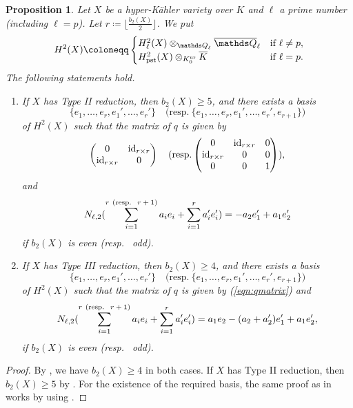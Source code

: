 \documentclass[12pt,reqno]{amsart}
\newtheorem{prop}[thm]{Proposition}
\theoremstyle{definition}
\newcommand{\Q}{{\mathds Q}}
\DeclareMathOperator{\pst}{pst}
\numberwithin{equation}{section}
\begin{document}
\begin{prop}
\label{prop:conjugacyclassofN}
Let $X$ be a hyper-Kähler variety over $K$ and $\ell$ a prime number (including $\ell =p$).
Let $r \coloneqq\lfloor \frac{b_2(X)}{2} \rfloor$.
We put
\[
H^2(X) \coloneqq 
\begin{cases}
H^2_\ell(X) \otimes_{\Q_\ell} \overline{\Q}_{\ell}
& \textup{if }\ell \neq p, \\
H^2_{\pst} (X) \otimes_{K_{0}^{\mathrm{ur}}} \overline{K} & \textup{if }\ell = p.
\end{cases}
\]
The following statements hold.
\begin{enumerate}
    \item 
If $X$ has Type II reduction, then $b_2(X) \geq 5$, and there exists a basis 
\[
\{
e_1, \ldots, e_r, e_1', \ldots, e_r'
\}
\quad \mathrm{(resp.~ }\{e_1, \ldots, e_r, e_1', \ldots, e_r', e_{r+1}\})
\]
of $H^2(X)$
such that the matrix of $q$ is given by 
\begin{equation}
\label{eqn:qmatrix}
\begin{pmatrix}
    0 & \mathrm{id}_{r \times r}\\
    \mathrm{id}_{r \times r} & 0
\end{pmatrix}
\quad \textup{(resp.}
\begin{pmatrix}
    0 & \mathrm{id}_{r \times r} & 0 \\
    \mathrm{id}_{r \times r} & 0 &0\\
    0 & 0 & 1
\end{pmatrix}
),
\end{equation}
and 
\[
N_{\ell,2} ( \sum_{i=1}^{r\ (\textup{resp.~ $r+1$})} a_i e_i + \sum_{i=1}^{r} a_i' e_i')
= -a_2 e_1' + a_1e_2'
\]
if $b_2 (X)$ is even (resp.~ odd).
    \item
If $X$ has Type III reduction, 
then $b_2(X) \geq 4$, and there exists a basis 
\[
\{
e_1, \ldots, e_r, e_1', \ldots, e_r'
\}
\quad \mathrm{(resp.~ }\{e_1, \ldots, e_r, e_1', \ldots, e_r', e_{r+1}\})
\]
of $H^2(X)$
such that the matrix of $q$ is given by (\ref{eqn:qmatrix}) and
\[
N_{\ell,2} ( \sum_{i=1}^{r\ (\textup{resp.~ $r+1$})} a_i e_i + \sum_{i=1}^{r} a_i' e_i')
= a_1 e_2 - (a_2 +a_2') e_{1}' + a_1 e_2',
\]
if $b_2 (X)$ is even (resp.~ odd).
\end{enumerate}
\end{prop}

\begin{proof}
By , we have $b_2(X) \geq 4$ in both cases.
If $X$ has Type II reduction, then $b_2(X) \geq 5$ by .
For the existence of the required basis, the same proof as in \cite[Lemma 5.10]{GKLR} works by using .
\end{proof}
    
\end{document}
